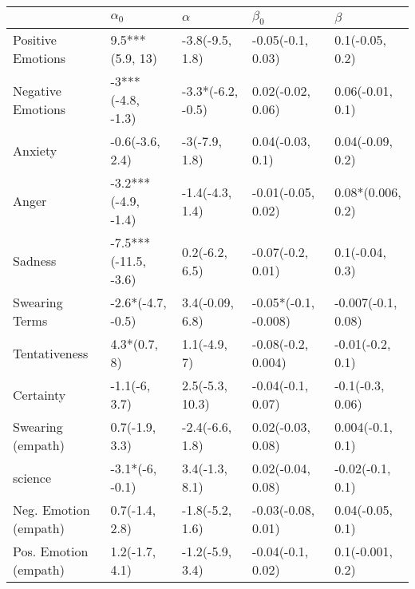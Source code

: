 \begin{tabular}{lllll}
\toprule
{} &            $\alpha_0$ &           $\alpha$ &             $\beta_0$ &             $\beta$ \\
\midrule
Positive Emotions     &       9.5***(5.9, 13) &    -3.8(-9.5, 1.8) &     -0.05(-0.1, 0.03) &     0.1(-0.05, 0.2) \\
Negative Emotions     &     -3***(-4.8, -1.3) &  -3.3*(-6.2, -0.5) &     0.02(-0.02, 0.06) &    0.06(-0.01, 0.1) \\
Anxiety               &       -0.6(-3.6, 2.4) &      -3(-7.9, 1.8) &      0.04(-0.03, 0.1) &    0.04(-0.09, 0.2) \\
Anger                 &   -3.2***(-4.9, -1.4) &    -1.4(-4.3, 1.4) &    -0.01(-0.05, 0.02) &   0.08*(0.006, 0.2) \\
Sadness               &  -7.5***(-11.5, -3.6) &     0.2(-6.2, 6.5) &     -0.07(-0.2, 0.01) &     0.1(-0.04, 0.3) \\
Swearing Terms        &     -2.6*(-4.7, -0.5) &    3.4(-0.09, 6.8) &  -0.05*(-0.1, -0.008) &  -0.007(-0.1, 0.08) \\
Tentativeness         &          4.3*(0.7, 8) &       1.1(-4.9, 7) &    -0.08(-0.2, 0.004) &    -0.01(-0.2, 0.1) \\
Certainty             &         -1.1(-6, 3.7) &    2.5(-5.3, 10.3) &     -0.04(-0.1, 0.07) &    -0.1(-0.3, 0.06) \\
Swearing (empath)     &        0.7(-1.9, 3.3) &    -2.4(-6.6, 1.8) &     0.02(-0.03, 0.08) &    0.004(-0.1, 0.1) \\
science               &       -3.1*(-6, -0.1) &     3.4(-1.3, 8.1) &     0.02(-0.04, 0.08) &    -0.02(-0.1, 0.1) \\
Neg. Emotion (empath) &        0.7(-1.4, 2.8) &    -1.8(-5.2, 1.6) &    -0.03(-0.08, 0.01) &    0.04(-0.05, 0.1) \\
Pos. Emotion (empath) &        1.2(-1.7, 4.1) &    -1.2(-5.9, 3.4) &     -0.04(-0.1, 0.02) &    0.1(-0.001, 0.2) \\
\bottomrule
\end{tabular}
